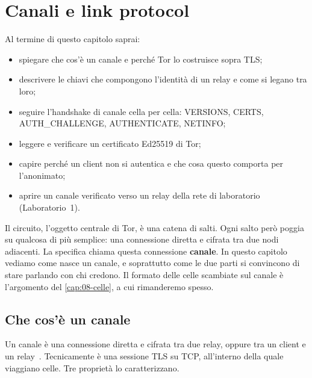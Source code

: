 \chapter{Canali e link protocol}\label{cap:07-canali}

\begin{obiettivi}
Al termine di questo capitolo saprai:
\begin{itemize}[nosep]
  \item spiegare che cos'è un canale e perché Tor lo costruisce sopra TLS;
  \item descrivere le chiavi che compongono l'identità di un relay e come si legano tra loro;
  \item seguire l'handshake di canale cella per cella: VERSIONS, CERTS, AUTH\_CHALLENGE, AUTHENTICATE, NETINFO;
  \item leggere e verificare un certificato Ed25519 di Tor;
  \item capire perché un client non si autentica e che cosa questo comporta per l'anonimato;
  \item aprire un canale verificato verso un relay della rete di laboratorio (Laboratorio~1).
\end{itemize}
\end{obiettivi}

Il circuito, l'oggetto centrale di Tor, è una catena di salti. Ogni salto però poggia su qualcosa di più semplice: una connessione diretta e cifrata tra due nodi adiacenti. La specifica chiama questa connessione \textbf{canale}. In questo capitolo vediamo come nasce un canale, e soprattutto come le due parti si convincono di stare parlando con chi credono. Il formato delle celle scambiate sul canale è l'argomento del \cref{cap:08-celle}, a cui rimanderemo spesso.

\section{Che cos'è un canale}\label{sec:canale-def}

Un canale è una connessione diretta e cifrata tra due relay, oppure tra un client e un relay~. Tecnicamente è una sessione TLS su TCP, all'interno della quale viaggiano celle. Tre proprietà lo caratterizzano.

